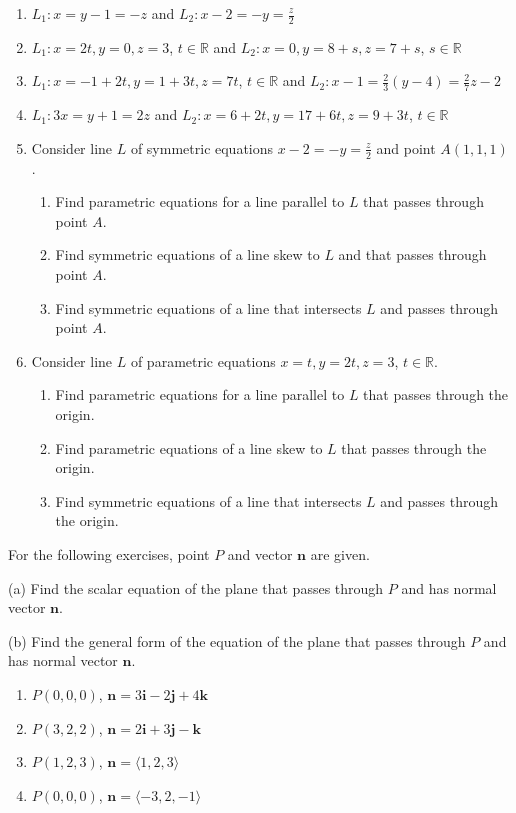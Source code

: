 \documentclass{exercises}
\begin{document}
\begin{enumerate}[resume]
\item $L_{1}:x=y-1=-z$ and $L_{2}:x-2=-y=\frac{z}{2}$
\item $L_{1}:x=2t,y=0,z=3$, $t\in \mathbb{R}$ and $L_{2}:x=0,y=8+s,z=7+s$, $s\in \mathbb{R}$
\item $L_{1}:x=-1+2t,y=1+3t,z=7t$, $t\in \mathbb{R}$ and $L_{2}:x-1=\frac{2}{3}(y-4)=\frac{2}{7}z-2$
\item $L_{1}:3x=y+1=2z$ and $L_{2}:x=6+2t,y=17+6t,z=9+3t$, $t\in \mathbb{R}$
\item Consider line $L$ of symmetric equations $x-2=-y=\frac{z}{2}$ and point $A(1,1,1)$.
\begin{enumerate}[label=(\alph*)]
  \item Find parametric equations for a line parallel to $L$ that passes through point $A$.
  \item Find symmetric equations of a line skew to $L$ and that passes through point $A$.
  \item Find symmetric equations of a line that intersects $L$ and passes through point $A$.
\end{enumerate}
\item Consider line $L$ of parametric equations $x=t,y=2t,z=3$, $t\in \mathbb{R}$.
\begin{enumerate}[label=(\alph*)]
  \item Find parametric equations for a line parallel to $L$ that passes through the origin.
  \item Find parametric equations of a line skew to $L$ that passes through the origin.
  \item Find symmetric equations of a line that intersects $L$ and passes through the origin.
\end{enumerate}
\end{enumerate}

For the following exercises, point $P$ and vector $\mathbf{n}$ are given.


(a) Find the scalar equation of the plane that passes through $P$ and has normal vector $\mathbf{n}$.


(b) Find the general form of the equation of the plane that passes through $P$ and has normal vector $\mathbf{n}$.

\begin{enumerate}[resume]
\item $P(0,0,0)$, $\mathbf{n}=3\mathbf{i}-2\mathbf{j}+4\mathbf{k}$
\item $P(3,2,2)$, $\mathbf{n}=2\mathbf{i}+3\mathbf{j}-\mathbf{k}$
\item $P(1,2,3)$, $\mathbf{n}=\langle1,2,3\rangle$
\item $P(0,0,0)$, $\mathbf{n}=\langle-3,2,-1\rangle$
\end{enumerate}
\end{document}

